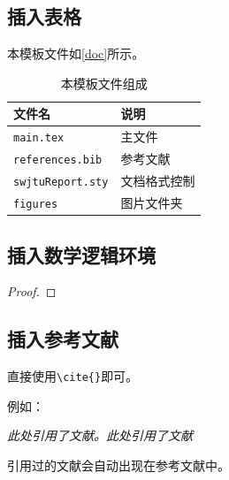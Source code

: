 \subsection{插入表格}
本模板文件如\autoref{doc}所示。
\begin{table}[!htbp]
    \centering
    \begin{tabular}{l|l}
    \hline
        文件名 & 说明 \\
        \hline
        \texttt{main.tex}  & 主文件 \\
        \texttt{references.bib} & 参考文献 \\
        \texttt{swjtuReport.sty}  & 文档格式控制\\
        \texttt{figures}  & 图片文件夹 \\
        \hline
    \end{tabular}
    \caption{本模板文件组成}
    \label{doc}
\end{table}

\subsection{插入数学逻辑环境}
\begin{Theorem}   %
\end{Theorem}

\begin{Lemma}   %
\end{Lemma}

\begin{Corollary}   %
\end{Corollary}

\begin{Proposition}   %
\end{Proposition}

\begin{Definition}   %
\end{Definition}

\begin{Example}   %
\end{Example}

\begin{proof}   %
\end{proof}

\subsection{插入参考文献}
直接使用\verb|\cite{}|即可。

例如：

   \textit{ 此处引用了文献\cite{0Isaac}。此处引用了文献\cite{2016The}}

引用过的文献会自动出现在参考文献中。